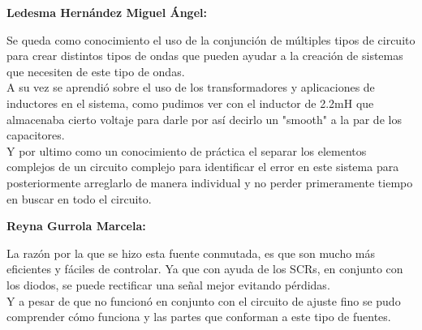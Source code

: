 \documentclass[letterpaper]{article}
\begin{document}
\textbf{Ledesma Hernández Miguel Ángel:\\}
\begin{large}
    Se queda como conocimiento el uso de la conjunción de múltiples tipos de circuito para crear distintos tipos de ondas que pueden ayudar a la creación de sistemas que necesiten de este tipo de ondas.\\
A su vez se aprendió sobre el uso de los transformadores y aplicaciones de inductores en el sistema, como pudimos ver con el inductor de 2.2mH que almacenaba cierto voltaje para darle por así decirlo un "smooth" a la par de los capacitores.\\
Y por ultimo como un conocimiento de práctica el separar los elementos complejos de un circuito complejo para identificar el error en este sistema para posteriormente arreglarlo de manera individual y no perder primeramente tiempo en buscar en todo el circuito.\\
\end{large}

\textbf{Reyna Gurrola Marcela:\\}
\begin{large}
La razón por la que se hizo esta fuente conmutada, es que son mucho más eficientes y fáciles de controlar. Ya que con ayuda de los SCRs, en conjunto con los diodos, se puede rectificar una señal mejor evitando pérdidas.\\ Y a pesar de que no funcionó en conjunto con el circuito de ajuste fino se pudo comprender cómo funciona y las partes que conforman a este tipo de fuentes. 
\end{large}
\end{document}
